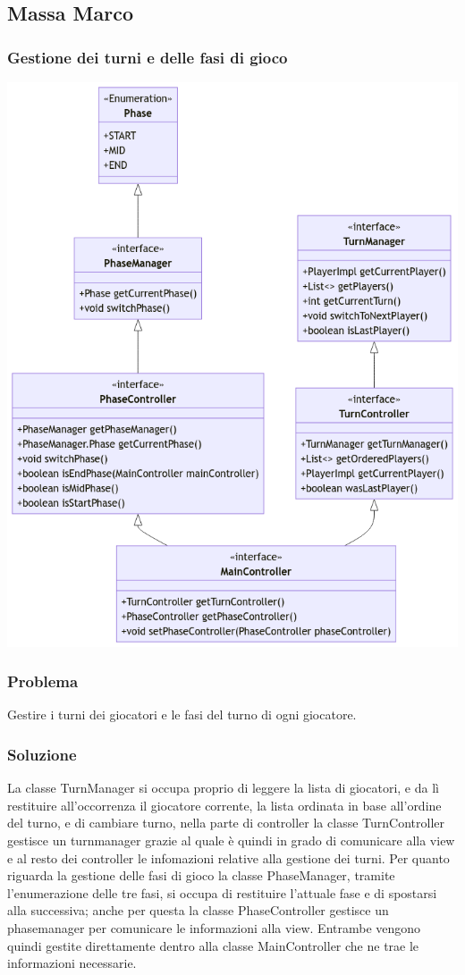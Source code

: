 \documentclass[a4paper,12pt]{report}
\begin{document}
\subsection{Massa Marco}
\subsubsection{Gestione dei turni e delle fasi di gioco}
\begin{center}
\includegraphics[scale=0.5]{PhaseManagerandTurnManagerUML.png}
\end{center}

%
\subsubsection{Problema}  
%
Gestire i turni dei giocatori e le fasi del turno di ogni giocatore.
%
\subsubsection{Soluzione} 
%
La classe TurnManager si occupa proprio di leggere la lista di giocatori, e da lì restituire all'occorrenza il giocatore corrente, la lista ordinata in base all'ordine del turno, e di cambiare turno, nella parte di controller la classe TurnController gestisce un turnmanager grazie al quale è quindi in grado di comunicare alla view e al resto dei controller le infomazioni relative alla gestione dei turni. Per quanto riguarda la gestione delle fasi di gioco la classe PhaseManager, tramite l'enumerazione delle tre fasi, si occupa di restituire l'attuale fase e di spostarsi alla successiva; anche per questa la classe PhaseController gestisce un phasemanager per comunicare le informazioni alla view. Entrambe vengono quindi gestite direttamente dentro alla classe MainController che ne trae le informazioni necessarie.
\newpage
\end{document}
